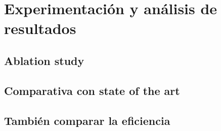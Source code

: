 \chapter{Experimentación y análisis de resultados}

\section{Ablation study}

\section{Comparativa con state of the art}

\section{También comparar la eficiencia}
